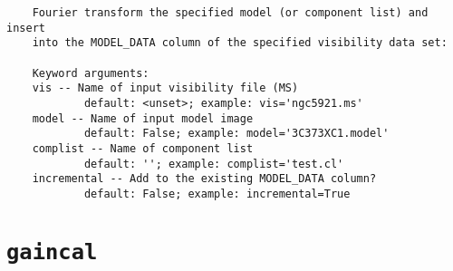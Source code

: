 \small
\begin{verbatim}
    Fourier transform the specified model (or component list) and insert
    into the MODEL_DATA column of the specified visibility data set:  
    
    Keyword arguments:
    vis -- Name of input visibility file (MS)
            default: <unset>; example: vis='ngc5921.ms'
    model -- Name of input model image
            default: False; example: model='3C373XC1.model'
    complist -- Name of component list
            default: ''; example: complist='test.cl'
    incremental -- Add to the existing MODEL_DATA column?
            default: False; example: incremental=True
\end{verbatim}
\normalsize


\section{{\tt gaincal}}
\label{section:tasks.gaincal}

